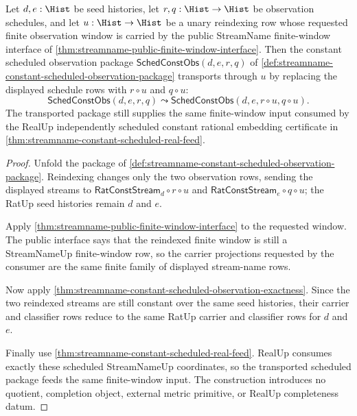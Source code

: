 \begin{theorem}
\label{thm:streamname-scheduled-window-reindex-stability}
Let $d,e:\Hist$ be seed histories, let $r,q:\Hist\to\Hist$ be observation
schedules, and let $u:\Hist\to\Hist$ be a unary reindexing row whose requested
finite observation window is carried by the public StreamName finite-window
interface of \autoref{thm:streamname-public-finite-window-interface}. Then the
constant scheduled observation package
$\mathsf{SchedConstObs}(d,e,r,q)$ of
\autoref{def:streamname-constant-scheduled-observation-package} transports
through $u$ by replacing the displayed schedule rows with $r\circ u$ and
$q\circ u$:
$$
\mathsf{SchedConstObs}(d,e,r,q)
\leadsto
\mathsf{SchedConstObs}(d,e,r\circ u,q\circ u).
$$
The transported package still supplies the same finite-window input consumed by
the RealUp independently scheduled constant rational embedding certificate in
\autoref{thm:streamname-constant-scheduled-real-feed}.
\end{theorem}
\begin{proof}
Unfold the package of
\autoref{def:streamname-constant-scheduled-observation-package}.  Reindexing
changes only the two observation rows, sending the displayed streams to
$\mathsf{RatConstStream}_d\circ r\circ u$ and
$\mathsf{RatConstStream}_e\circ q\circ u$; the RatUp seed histories remain
$d$ and $e$.

Apply \autoref{thm:streamname-public-finite-window-interface} to the requested
window.  The public interface says that the reindexed finite window is still a
StreamNameUp finite-window row, so the carrier projections requested by the
consumer are the same finite family of displayed stream-name rows.

Now apply
\autoref{thm:streamname-constant-scheduled-observation-exactness}.  Since the
two reindexed streams are still constant over the same seed histories, their
carrier and classifier rows reduce to the same RatUp carrier and classifier
rows for $d$ and $e$.

Finally use \autoref{thm:streamname-constant-scheduled-real-feed}.  RealUp
consumes exactly these scheduled StreamNameUp coordinates, so the transported
scheduled package feeds the same finite-window input.  The construction
introduces no quotient, completion object, external metric primitive, or
RealUp completeness datum.
\end{proof}

